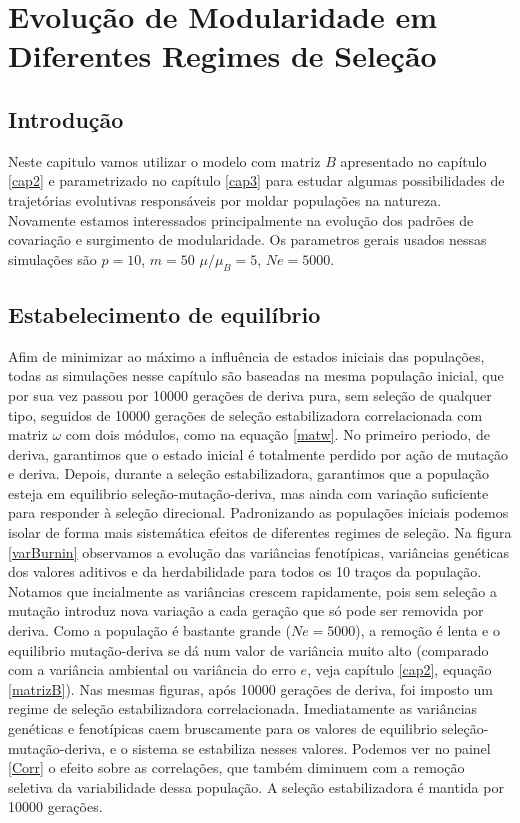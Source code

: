 \pagestyle{empty}
\cleardoublepage
\pagestyle{fancy}
\chapter{Evolução de Modularidade em Diferentes Regimes de
Seleção}\label{cap4}

\section{Introdução}

Neste capitulo vamos utilizar o modelo com matriz $B$ apresentado no
capítulo \ref{cap2} e parametrizado no capítulo \ref{cap3} para estudar
algumas possibilidades de trajetórias evolutivas responsáveis por moldar
populações na natureza. 
Novamente estamos interessados principalmente na evolução dos padrões de
covariação e surgimento de modularidade. 
Os parametros gerais usados nessas simulações são $p = 10$, $m = 50$
$\mu/\mu_B = 5$, $Ne = 5000$. 

\section{Estabelecimento de equilíbrio}

Afim de minimizar ao máximo a influência de estados iniciais das
populações, todas as simulações nesse capítulo são baseadas na mesma
população inicial, que por sua vez passou por 10000 gerações de deriva
pura, sem seleção de qualquer tipo, seguidos de 10000 gerações de
seleção estabilizadora correlacionada com matriz $\omega$ com dois
módulos, como na equação \ref{matw}. 
No primeiro periodo, de deriva, garantimos que o estado inicial é
totalmente perdido por ação de mutação e deriva. 
Depois, durante a seleção estabilizadora, garantimos que a população
esteja em equilibrio seleção-mutação-deriva, mas ainda com variação
suficiente para responder à seleção direcional. 
Padronizando as populações iniciais podemos isolar de forma mais
sistemática efeitos de diferentes regimes de seleção. 
Na figura \ref{varBurnin} observamos a evolução das variâncias
fenotípicas, variâncias genéticas dos valores aditivos e da
herdabilidade para todos os 10 traços da população. 
Notamos que incialmente as variâncias crescem rapidamente, pois sem
seleção a mutação introduz nova variação a cada geração que só pode ser
removida por deriva. 
Como a população é bastante grande ($Ne = 5000$), a remoção é lenta e o
equilibrio mutação-deriva se dá num valor de variância muito alto
(comparado com a variância ambiental ou variância do erro $e$, veja
capítulo \ref{cap2}, equação \ref{matrizB}). 
Nas mesmas figuras, após 10000 gerações de deriva, foi imposto um regime de
seleção estabilizadora correlacionada. 
Imediatamente as variâncias genéticas e fenotípicas caem bruscamente
para os valores de equilibrio seleção-mutação-deriva, e o sistema se
estabiliza nesses valores. 
Podemos ver no painel \ref{Corr} o efeito sobre as correlações,
que também diminuem com a remoção seletiva da variabilidade dessa
população. 
A seleção estabilizadora é mantida por 10000 gerações.

